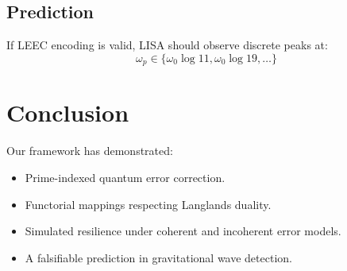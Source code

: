 \documentclass[12]{amsart}
\theoremstyle{plain}
\begin{document}
\subsection{Prediction}
If LEEC encoding is valid, LISA should observe discrete peaks at:
\[
\omega_{p} \in \{\omega_0 \log 11, \omega_0 \log 19, \dots\}
\]

\section{Conclusion}
Our framework has demonstrated:
\begin{itemize}
    \item Prime-indexed quantum error correction.
    \item Functorial mappings respecting Langlands duality.
    \item Simulated resilience under coherent and incoherent error models.
    \item A falsifiable prediction in gravitational wave detection.
\end{itemize}

\clearpage
\end{document}
